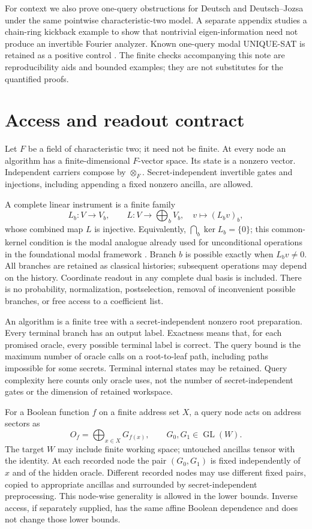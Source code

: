 \documentclass[11pt]{article}
\DeclareMathOperator{\GL}{GL}
\begin{document}
For context we also prove one-query obstructions for Deutsch and Deutsch--Jozsa under the same pointwise characteristic-two model. A separate appendix studies a chain-ring kickback example to show that nontrivial eigen-information need not produce an invertible Fourier analyzer. Known one-query modal UNIQUE-SAT is retained as a positive control \cite{WillcockSabry2011}. The finite checks accompanying this note are reproducibility aids and bounded examples; they are not substitutes for the quantified proofs.

\section{Access and readout contract}\label{sec:contract}
Let $F$ be a field of characteristic two; it need not be finite. At every node an algorithm has a finite-dimensional $F$-vector space. Its state is a nonzero vector. Independent carriers compose by $\otimes_F$. Secret-independent invertible gates and injections, including appending a fixed nonzero ancilla, are allowed.

A complete linear instrument is a finite family
\[
 L_b:V\longrightarrow V_b,\qquad
 L:V\longrightarrow\bigoplus_bV_b,\quad v\longmapsto (L_bv)_b,
\]
whose combined map $L$ is injective. Equivalently, $\bigcap_b\ker L_b=\{0\}$; this common-kernel condition is the modal analogue already used for unconditional operations in the foundational modal framework \cite{Schumacher2012}. Branch $b$ is possible exactly when $L_bv\ne0$. All branches are retained as classical histories; subsequent operations may depend on the history. Coordinate readout in any complete dual basis is included. There is no probability, normalization, postselection, removal of inconvenient possible branches, or free access to a coefficient list.

An algorithm is a finite tree with a secret-independent nonzero root preparation. Every terminal branch has an output label. Exactness means that, for each promised oracle, every possible terminal label is correct. The query bound is the maximum number of oracle calls on a root-to-leaf path, including paths impossible for some secrets. Terminal internal states may be retained. Query complexity here counts only oracle uses, not the number of secret-independent gates or the dimension of retained workspace.

For a Boolean function $f$ on a finite address set $X$, a query node acts on address sectors as
\begin{equation}\label{eq:oracle}
 O_f=\bigoplus_{x\in X}G_{f(x)},\qquad G_0,G_1\in\GL(W).
\end{equation}
The target $W$ may include finite working space; untouched ancillas tensor with the identity. At each recorded node the pair $(G_0,G_1)$ is fixed independently of $x$ and of the hidden oracle. Different recorded nodes may use different fixed pairs, copied to appropriate ancillas and surrounded by secret-independent preprocessing. This node-wise generality is allowed in the lower bounds. Inverse access, if separately supplied, has the same affine Boolean dependence and does not change those lower bounds.
\end{document}
